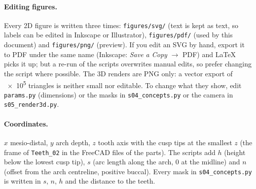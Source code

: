 \paragraph{Editing figures.} Every 2D figure is written three times: \texttt{figures/svg/} (text is
kept as text, so labels can be edited in Inkscape or Illustrator), \texttt{figures/pdf/} (used by
this document) and \texttt{figures/png/} (preview). If you edit an SVG by hand, export it to PDF
under the same name (Inkscape: \emph{Save a Copy} $\rightarrow$ PDF) and LaTeX picks it up; but a
re-run of the scripts overwrites manual edits, so prefer changing the script where possible. The 3D
renders are PNG only: a vector export of \num{e5} triangles is neither small nor editable. To
change what they show, edit \texttt{params.py} (dimensions) or the masks in \texttt{s04\_concepts.py} or the camera in
\texttt{s05\_render3d.py}.

\paragraph{Coordinates.} $x$ mesio-distal, $y$ arch depth, $z$ tooth axis with the cusp tips at the
smallest $z$ (the frame of \texttt{Teeth\_02} in the FreeCAD files of the parts). The
scripts add $h$ (height below the lowest cusp tip), $s$ (arc length along the arch, 0 at the
midline) and $n$ (offset from the arch centreline, positive buccal). Every mask in
\texttt{s04\_concepts.py} is written in $s$, $n$, $h$ and the distance to the teeth.
